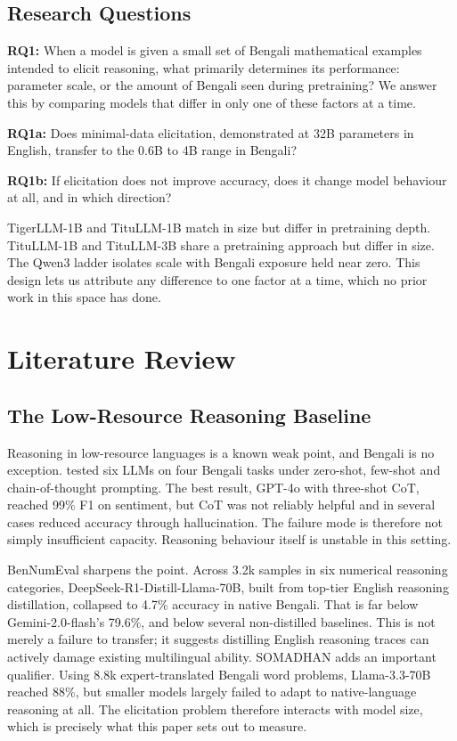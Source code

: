 \documentclass[10pt,twocolumn,letterpaper]{article}
\begin{document}
\subsection{Research Questions}

\textbf{RQ1:} When a model is given a small set of Bengali mathematical examples
intended to elicit reasoning, what primarily determines its performance:
parameter scale, or the amount of Bengali seen during pretraining? We answer
this by comparing models that differ in only one of these factors at a time.

\textbf{RQ1a:} Does minimal-data elicitation, demonstrated at 32B parameters in
English, transfer to the 0.6B to 4B range in Bengali?

\textbf{RQ1b:} If elicitation does not improve accuracy, does it change model
behaviour at all, and in which direction?

TigerLLM-1B and TituLLM-1B match in size but differ in pretraining depth.
TituLLM-1B and TituLLM-3B share a pretraining approach but differ in size. The
Qwen3 ladder isolates scale with Bengali exposure held near zero. This design
lets us attribute any difference to one factor at a time, which no prior work in
this space has done.


\section{Literature Review}

\subsection{The Low-Resource Reasoning Baseline}

Reasoning in low-resource languages is a known weak point, and Bengali is no
exception. \textcite{alnazi2025eval} tested six LLMs on four Bengali tasks under
zero-shot, few-shot and chain-of-thought prompting. The best result, GPT-4o with
three-shot CoT, reached 99\% F1 on sentiment, but CoT was not reliably helpful
and in several cases reduced accuracy through hallucination. The failure mode is
therefore not simply insufficient capacity. Reasoning behaviour itself is
unstable in this setting.

BenNumEval \parencite{ahmed2025bennumeval} sharpens the point. Across 3.2k
samples in six numerical reasoning categories,
DeepSeek-R1-Distill-Llama-70B, built from top-tier English reasoning
distillation, collapsed to 4.7\% accuracy in native Bengali. That is far below
Gemini-2.0-flash's 79.6\%, and below several non-distilled baselines. This is
not merely a failure to transfer; it suggests distilling English reasoning
traces can actively damage existing multilingual ability. SOMADHAN
\parencite{paul2025somadhan} adds an important qualifier. Using 8.8k
expert-translated Bengali word problems, Llama-3.3-70B reached 88\%, but smaller
models largely failed to adapt to native-language reasoning at all. The
elicitation problem therefore interacts with model size, which is precisely what
this paper sets out to measure.
\end{document}
